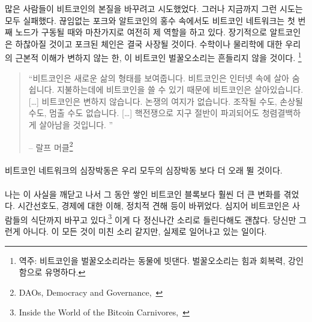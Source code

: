 많은 사람들이 비트코인의 본질을 바꾸려고 시도했었다. 그러나 지금까지 그런 시도는 모두 실패했다. 
끊임없는 포크와 알트코인의 홍수 속에서도 비트코인 네트워크는 첫 번째 노드가 구동될 때와 마찬가지로 여전히 제 역할을 하고 있다.
장기적으로 알트코인은 하찮아질 것이고 포크된 체인은 결국 사장될 것이다.
수학이나 물리학에 대한 우리의 근본적 이해가 변하지 않는 한, 이 비트코인 벌꿀오소리는 흔들리지 않을 것이다.
\footnote{역주: 비트코인을 벌꿀오소리라는 동물에 빗댄다. 벌꿀오소리는 힘과 회복력, 강인함으로 유명하다.}

\begin{quotation}\begin{samepage}
		\enquote{비트코인은 새로운 삶의 형태를 보여줍니다. 비트코인은 인터넷 속에 살아 숨 쉽니다. 
		지불하는데에 비트코인을 쓸 수 있기 때문에 비트코인은 살아있습니다. [\ldots] 비트코인은 변하지 않습니다. 논쟁의 여지가 없습니다.
		조작될 수도, 손상될 수도, 멈출 수도 없습니다. [\ldots] 핵전쟁으로 지구 절반이 파괴되어도 청렴결백하게 살아남을 것입니다. }
		\begin{flushright} -- 랄프 머클\footnote{DAOs, Democracy and Governance,~\cite{merkle-dao}}
\end{flushright}\end{samepage}\end{quotation}

\paragraph{}
비트코인 네트워크의 심장박동은 우리 모두의 심장박동 보다 더 오래 뛸 것이다.

\paragraph{}
나는 이 사실을 깨닫고 나서 그 동안 쌓인 비트코인 블록보다 훨씬 더 큰 변화를 겪었다.
시간선호도, 경제에 대한 이해, 정치적 견해 등이 바뀌었다. 
심지어 비트코인은 사람들의 식단까지 바꾸고 있다.\footnote{Inside the World of the Bitcoin Carnivores,~\cite{carnivores}} 
이게 다 정신나간 소리로 들린다해도 괜찮다. 당신만 그런게 아니다.
이 모든 것이 미친 소리 같지만, 실제로 일어나고 있는 일이다.

